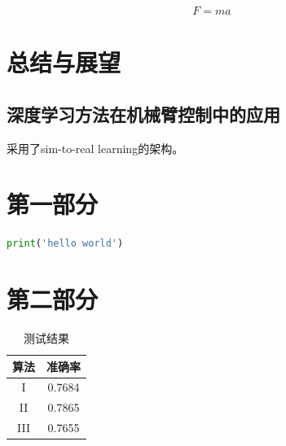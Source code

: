 \documentclass[a4paper,12pt]{paper}
\begin{document}
\begin{equation}
    F=ma
\end{equation}

\chapter{总结与展望}

\section{深度学习方法在机械臂控制中的应用}

\cite{wilson2019learning}采用了sim-to-real learning的架构。





\begin{appendix}

\chapter{第一部分}

\begin{lstlisting}[language=python]
print('hello world') 
\end{lstlisting}

\chapter{第二部分}

\begin{table}[]
    \centering
    \caption{测试结果}
    \label{tab:my-table}
    \begin{tabular}{@{}cc@{}}
    \toprule
    算法 & 准确率 \\ \midrule
    I & 0.7684 \\
    II & 0.7865 \\
    III & 0.7655 \\ \bottomrule
    \end{tabular}
\end{table}

\end{appendix}
\end{document}
